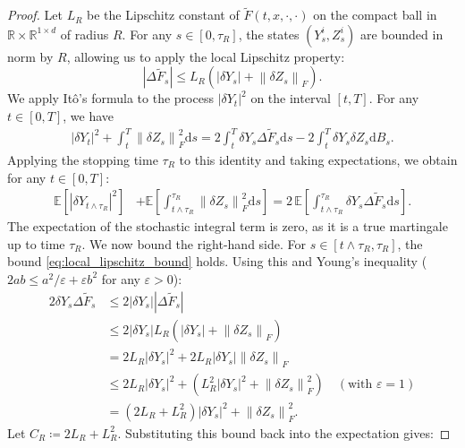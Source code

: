 \documentclass[12pt, letterpaper]{amsart}
\newcommand{\R}{\mathbb{R}}
\newcommand{\dd}{\mathrm{d}}
\newcommand{\norm}[1]{\left\lVert#1\right\rVert}
\newcommand{\abs}[1]{\left\lvert#1\right\rvert}
\theoremstyle{plain}
\theoremstyle{definition}
\theoremstyle{remark}
\numberwithin{equation}{section} %
\begin{document}
\begin{proof}
Let \(L_R\) be the Lipschitz constant of \(\tilde{F}(t,x, \cdot, \cdot)\) on the compact ball in $\R \times \R^{1\times d}$ of radius $R$. For any \(s \in [0, \tau_R]\), the states \((Y^i_s, Z^i_s)\) are bounded in norm by $R$, allowing us to apply the local Lipschitz property:
\begin{equation}\label{eq:local_lipschitz_bound}
    \abs{\Delta \tilde{F}_s} \le L_R \left( \abs{\delta Y_s} + \norm{\delta Z_s}_F \right).
\end{equation}
We apply Itô's formula to the process $\abs{\delta Y_t}^2$ on the interval $[t,T]$. For any $t \in [0,T]$, we have
\begin{equation} \label{eq:proof_ito_deltaY}
\begin{split}
    \abs{\delta Y_t}^2 + \int_t^T \norm{\delta Z_s}_F^2 \dd s = 2 \int_t^T \delta Y_s \Delta \tilde{F}_s \dd s - 2 \int_t^T \delta Y_s \delta Z_s \dd B_s.
\end{split}
\end{equation}
Applying the stopping time $\tau_R$ to this identity and taking expectations, we obtain for any $t \in [0,T]$:
\begin{align*}
    \mathbb{E}\left[\abs{\delta Y_{t \wedge \tau_R}}^2\right] &+ \mathbb{E}\left[\int_{t \wedge \tau_R}^{\tau_R} \norm{\delta Z_s}_F^2 \dd s\right] = 2 \, \mathbb{E}\left[\int_{t \wedge \tau_R}^{\tau_R} \delta Y_s \Delta \tilde{F}_s \dd s\right].
\end{align*}
The expectation of the stochastic integral term is zero, as it is a true martingale up to time $\tau_R$. We now bound the right-hand side. For $s \in [t \wedge \tau_R, \tau_R]$, the bound \eqref{eq:local_lipschitz_bound} holds. Using this and Young's inequality ($2ab \le a^2/\varepsilon + \varepsilon b^2$ for any $\varepsilon>0$):
\begin{align*}
    2 \delta Y_s \Delta \tilde{F}_s &\le 2 \abs{\delta Y_s} \abs{\Delta \tilde{F}_s} \\
    &\le 2 \abs{\delta Y_s} L_R (\abs{\delta Y_s} + \norm{\delta Z_s}_F) \\
    &= 2L_R \abs{\delta Y_s}^2 + 2L_R \abs{\delta Y_s} \norm{\delta Z_s}_F \\
    &\le 2L_R \abs{\delta Y_s}^2 + (L_R^2 \abs{\delta Y_s}^2 + \norm{\delta Z_s}_F^2) \quad (\text{with } \varepsilon=1)\\
    &= (2L_R + L_R^2) \abs{\delta Y_s}^2 + \norm{\delta Z_s}_F^2.
\end{align*}
Let \(C_R \coloneqq 2L_R + L_R^2\). Substituting this bound back into the expectation gives:

\end{proof}
\end{document}
